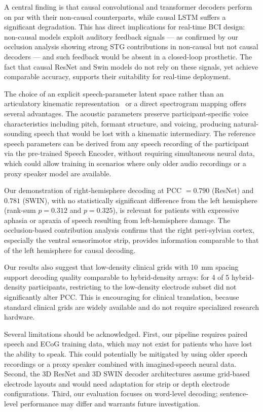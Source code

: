 \documentclass[10pt]{article}
\begin{document}
A central finding is that causal convolutional and transformer decoders perform on par with their non-causal counterparts, while causal LSTM suffers a significant degradation. This has direct implications for real-time BCI design: non-causal models exploit auditory feedback signals --- as confirmed by our occlusion analysis showing strong STG contributions in non-causal but not causal decoders --- and such feedback would be absent in a closed-loop prosthetic. The fact that causal ResNet and Swin models do not rely on these signals, yet achieve comparable accuracy, supports their suitability for real-time deployment.

The choice of an explicit speech-parameter latent space rather than an articulatory kinematic representation~\cite{anumanchipalli2019speech} or a direct spectrogram mapping offers several advantages. The acoustic parameters preserve participant-specific voice characteristics including pitch, formant structure, and voicing, producing natural-sounding speech that would be lost with a kinematic intermediary. The reference speech parameters can be derived from any speech recording of the participant via the pre-trained Speech Encoder, without requiring simultaneous neural data, which could allow training in scenarios where only older audio recordings or a proxy speaker model are available.

Our demonstration of right-hemisphere decoding at PCC $=0.790$ (ResNet) and $0.781$ (SWIN), with no statistically significant difference from the left hemisphere (rank-sum $p=0.312$ and $p=0.325$), is relevant for patients with expressive aphasia or apraxia of speech resulting from left-hemisphere damage. The occlusion-based contribution analysis confirms that the right peri-sylvian cortex, especially the ventral sensorimotor strip, provides information comparable to that of the left hemisphere for causal decoding.

Our results also suggest that low-density clinical grids with 10~mm spacing support decoding quality comparable to hybrid-density arrays: for 4 of 5 hybrid-density participants, restricting to the low-density electrode subset did not significantly alter PCC. This is encouraging for clinical translation, because standard clinical grids are widely available and do not require specialized research hardware.

Several limitations should be acknowledged. First, our pipeline requires paired speech and ECoG training data, which may not exist for patients who have lost the ability to speak. This could potentially be mitigated by using older speech recordings or a proxy speaker combined with imagined-speech neural data. Second, the 3D ResNet and 3D SWIN decoder architectures assume grid-based electrode layouts and would need adaptation for strip or depth electrode configurations. Third, our evaluation focuses on word-level decoding; sentence-level performance may differ and warrants future investigation.
\end{document}
